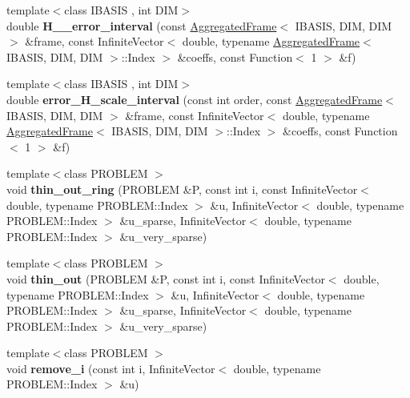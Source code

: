 \begin{CompactItemize}
\item 
\hypertarget{namespaceFrameTL_5f7cd84df62cbac0d03d55a63858d138}{
{\footnotesize template$<$class IBASIS , int DIM$>$ }\\double \textbf{H\_\_\-error\_\-interval} (const \hyperlink{classFrameTL_1_1AggregatedFrame}{AggregatedFrame}$<$ IBASIS, DIM, DIM $>$ \&frame, const InfiniteVector$<$ double, typename \hyperlink{classFrameTL_1_1AggregatedFrame}{AggregatedFrame}$<$ IBASIS, DIM, DIM $>$::Index $>$ \&coeffs, const Function$<$ 1 $>$ \&f)}
\label{namespaceFrameTL_5f7cd84df62cbac0d03d55a63858d138}

\item 
\hypertarget{namespaceFrameTL_1b900f7d22f4b32129f53074030c4d85}{
{\footnotesize template$<$class IBASIS , int DIM$>$ }\\double \textbf{error\_\-H\_\-scale\_\-interval} (const int order, const \hyperlink{classFrameTL_1_1AggregatedFrame}{AggregatedFrame}$<$ IBASIS, DIM, DIM $>$ \&frame, const InfiniteVector$<$ double, typename \hyperlink{classFrameTL_1_1AggregatedFrame}{AggregatedFrame}$<$ IBASIS, DIM, DIM $>$::Index $>$ \&coeffs, const Function$<$ 1 $>$ \&f)}
\label{namespaceFrameTL_1b900f7d22f4b32129f53074030c4d85}

\item 
\hypertarget{namespaceFrameTL_2c2397a9802a34ffc082c4de792c808d}{
{\footnotesize template$<$class PROBLEM $>$ }\\void \textbf{thin\_\-out\_\-ring} (PROBLEM \&P, const int i, const InfiniteVector$<$ double, typename PROBLEM::Index $>$ \&u, InfiniteVector$<$ double, typename PROBLEM::Index $>$ \&u\_\-sparse, InfiniteVector$<$ double, typename PROBLEM::Index $>$ \&u\_\-very\_\-sparse)}
\label{namespaceFrameTL_2c2397a9802a34ffc082c4de792c808d}

\item 
\hypertarget{namespaceFrameTL_9e04ddf27423214b1a0ffa4060ce6224}{
{\footnotesize template$<$class PROBLEM $>$ }\\void \textbf{thin\_\-out} (PROBLEM \&P, const int i, const InfiniteVector$<$ double, typename PROBLEM::Index $>$ \&u, InfiniteVector$<$ double, typename PROBLEM::Index $>$ \&u\_\-sparse, InfiniteVector$<$ double, typename PROBLEM::Index $>$ \&u\_\-very\_\-sparse)}
\label{namespaceFrameTL_9e04ddf27423214b1a0ffa4060ce6224}

\item 
\hypertarget{namespaceFrameTL_4c6e64c8471915c044140f434fd54372}{
{\footnotesize template$<$class PROBLEM $>$ }\\void \textbf{remove\_\-i} (const int i, InfiniteVector$<$ double, typename PROBLEM::Index $>$ \&u)}
\label{namespaceFrameTL_4c6e64c8471915c044140f434fd54372}


\end{CompactItemize}
